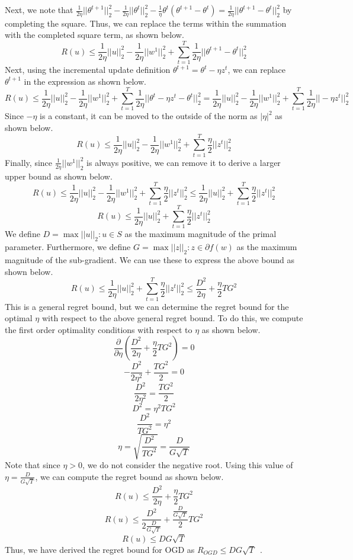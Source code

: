 \documentclass[11pt]{article}
\begin{document}
Next, we note that $\frac{1}{2\eta}||\theta^{t+1}||_2^2 - \frac{1}{2\eta}||\theta^t||_2^2 - \frac{1}{\eta}\theta^t(\theta^{t+1}-\theta^t) = \frac{1}{2\eta}||\theta^{t+1} - \theta^t||_2^2$ by completing the square. Thus, we can replace the terms within the summation with the completed square term, as shown below.
\[ R(u) \leq \frac{1}{2\eta}||u||_2^2 -  \frac{1}{2\eta}||w^1||_2^2 + \sum_{t=1}^T \frac{1}{2\eta}||\theta^{t+1} - \theta^t||_2^2 \]
Next, using the incremental update definition $\theta^{t+1} = \theta^{t} - \eta z^{t}$, we can replace $\theta^{t+1}$ in the expression as shown below.
\[ R(u) \leq \frac{1}{2\eta}||u||_2^2 -  \frac{1}{2\eta}||w^1||_2^2 + \sum_{t=1}^T \frac{1}{2\eta}||\theta^{t} - \eta z^{t} - \theta^t||_2^2 = \frac{1}{2\eta}||u||_2^2 -  \frac{1}{2\eta}||w^1||_2^2 + \sum_{t=1}^T \frac{1}{2\eta}||-\eta z^{t}||_2^2 \]
Since $-\eta$ is a constant, it can be moved to the outside of the norm as $|\eta|^2$ as shown below.
\[ R(u) \leq \frac{1}{2\eta}||u||_2^2 -  \frac{1}{2\eta}||w^1||_2^2 + \sum_{t=1}^T \frac{\eta}{2}||z^{t}||_2^2 \]
Finally, since $\frac{1}{2\eta}||w^1||_2^2$ is always positive, we can remove it to derive a larger upper bound as shown below.
\[ R(u) \leq \frac{1}{2\eta}||u||_2^2 -  \frac{1}{2\eta}||w^1||_2^2 + \sum_{t=1}^T \frac{\eta}{2}||z^{t}||_2^2 \leq \frac{1}{2\eta}||u||_2^2 +  \sum_{t=1}^T \frac{\eta}{2}||z^{t}||_2^2 \]
\[ R(u) \leq \frac{1}{2\eta}||u||_2^2 +  \sum_{t=1}^T \frac{\eta}{2}||z^{t}||_2^2 \]
We define $D = \max ||u||_2 : u \in S$ as the maximum magnitude of the primal parameter. Furthermore, we define $G = \max ||z||_2 : z \in \partial f(w)$ as the maximum magnitude of the sub-gradient. We can use these to express the above bound as shown below.
\[ R(u) \leq \frac{1}{2\eta}||u||_2^2 +  \sum_{t=1}^T \frac{\eta}{2}||z^{t}||_2^2 \leq \frac{D^2}{2\eta} + \frac{\eta}{2}TG^2 \]
This is a general regret bound, but we can determine the regret bound for the optimal $\eta$ with respect to the above general regret bound. To do this, we compute the first order optimality conditions with respect to $\eta$ as shown below.
\[ \frac{\partial}{\partial \eta} (\frac{D^2}{2\eta} + \frac{\eta}{2}TG^2) = 0 \]
\[ -\frac{D^2}{2\eta^2} + \frac{TG^2}{2} = 0 \]
\[ \frac{D^2}{2\eta^2} = \frac{TG^2}{2} \]
\[ D^2 = \eta^2TG^2 \]
\[ \frac{D^2}{TG^2} = \eta^2 \]
\[ \eta = \sqrt{\frac{D^2}{TG^2}} = \frac{D}{G\sqrt{T}} \]
Note that since $\eta > 0$, we do not consider the negative root. Using this value of $\eta = \frac{D}{G\sqrt{T}}$, we can compute the regret bound as shown below.
\[ R(u) \leq \frac{D^2}{2\eta} + \frac{\eta}{2}TG^2 \]
\[ R(u) \leq \frac{D^2}{2\frac{D}{G\sqrt{T}}} + \frac{\frac{D}{G\sqrt{T}}}{2}TG^2 \]
\[  R(u) \leq DG\sqrt{T} \]
Thus, we have derived the regret bound for OGD as $R_{OGD} \leq DG\sqrt{T}$~\cite{zinkevich2003online}.
\end{document}
